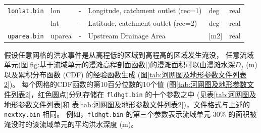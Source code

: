 \begin{table}[]
\begin{tabular}[h]{p{2.5cm}p{1.5cm}p{2.5cm}p{4cm}p{2cm}p{1cm}}
    \texttt{lonlat.bin}       & lon      & -                                  & Longitude, catchment outlet (rec=1)     & deg      & real    \\
                                     & lat       & -                                 & Latitude, catchment outlet (rec=2)        & deg       & real    \\
    \texttt{uparea.bin}       & uparea   & -                           & Upstream Drainage Area                       & {[}m2{]} & real    \\ \bottomrule
    \end{tabular}
    \end{table}


假设任意网格的洪水事件是从高程低的区域到高程高的区域发生淹没，
任意流域单元(图\ref{fig:基于流域单元的漫滩高程剖面函数})的漫滩面积可以由漫滩水深$D_f$ (m) 
以及累积分布函数 (CDF) 的经验函数生成 (图\ref{tab:河网图及地形参数文件列表2})。
每个网格的CDF函数的第10百分位数的10个值 (图\ref{tab:河网图及地形参数文件列表2}，红色圆点)分别存储在 \texttt{fldhgt.bin} 的十个参数之中
 (见表\ref{tab:河网图及地形参数文件列表}和 表\ref{tab:河网图及地形参数文件列表2})，文件格式与上述的 \texttt{nextxy.bin} 相同。
例如，\texttt{fldhgt.bin} 的第三个参数表示流域单元 30\% 的面积被淹没时的该流域单元的平均洪水深度 (m)。

